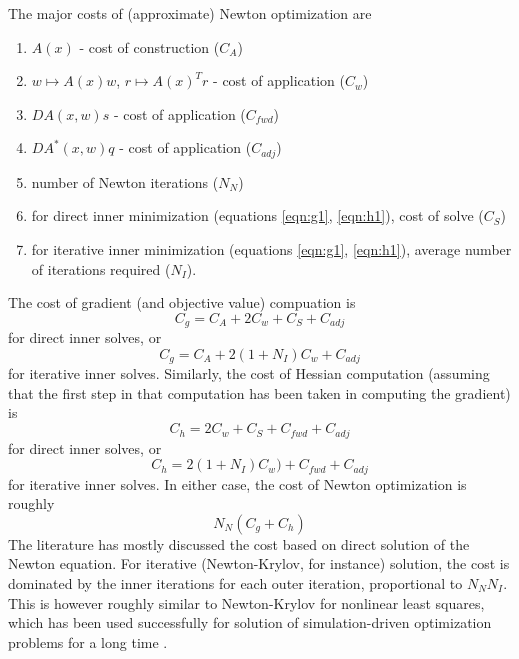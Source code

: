 The major costs of (approximate) Newton optimization are
\begin{enumerate}
\item $A(x)$ - cost of construction ($C_A$)
\item $w \mapsto A(x)w$, $r \mapsto A(x)^T r$ - cost of application ($C_w$)
\item $DA(x,w)s$ - cost of application ($C_{fwd}$)
\item $DA^*(x,w)q$ - cost of application ($C_{adj}$)
\item number of Newton iterations ($N_N$)
\item for direct inner minimization (equations \ref{eqn:g1}, \ref{eqn:h1}), cost of solve ($C_S$)
\item for iterative inner minimization (equations \ref{eqn:g1}, \ref{eqn:h1}), average number of iterations required ($N_I$).
\end{enumerate}
The cost of gradient (and objective value) compuation is
\[
  C_g = C_A + 2 C_w +C_S + C_{adj}
\]
for direct inner solves, or
\[
   C_g = C_A + 2 (1 + N_I)C_w + C_{adj}
 \]
for iterative inner solves. Similarly, the cost of Hessian computation (assuming that the first step in that computation has been taken in computing the gradient) is
\[
  C_h =  2 C_w +C_S + C_{fwd} + C_{adj}
\]
for direct inner solves, or
\[
   C_h = 2 (1 + N_I)C_w) + C_{fwd} + C_{adj}
 \]
for iterative inner solves. In either case, the cost of Newton optimization is roughly
\[
  N_N (C_g + C_h)
\]
The literature has mostly discussed the cost based on direct solution of the Newton equation. For iterative (Newton-Krylov, for instance) solution, the cost is dominated by the inner iterations for each outer iteration, proportional to $N_NN_I$. This is however roughly similar to Newton-Krylov for nonlinear least squares, which has been used successfully for solution of simulation-driven optimization problems for a long time \cite[]{Ghattas:IP25}.





